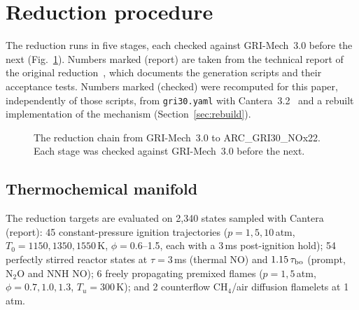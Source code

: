 \documentclass[preprint,review,12pt]{elsarticle}
\newcommand{\ce}[1]{\ensuremath{\mathrm{#1}}}
\begin{document}
\section{Reduction procedure}
\label{sec:reduction}

The reduction runs in five stages, each checked against GRI-Mech~3.0 before the next (Fig.~\ref{fig:pipeline}).
Numbers marked (report) are taken from the technical report of the original reduction~\cite{arcreport}, which
documents the generation scripts and their acceptance tests. Numbers marked (checked) were recomputed for this paper,
independently of those scripts, from \texttt{gri30.yaml} with Cantera~3.2~\cite{cantera} and a rebuilt
implementation of the mechanism (Section~\ref{sec:rebuild}).

\begin{figure}[t]
\centering
{}
\caption{The reduction chain from GRI-Mech~3.0 to ARC\_GRI30\_NOx22. Each stage was checked against GRI-Mech~3.0
before the next.}
\label{fig:pipeline}
\end{figure}

\subsection{Thermochemical manifold}
The reduction targets are evaluated on 2,340 states sampled with Cantera (report): 45 constant-pressure ignition
trajectories ($p=1,5,10$\,atm, $T_0=1150,1350,1550$\,K, $\phi=0.6$--1.5, each with a 3\,ms post-ignition hold);
54 perfectly stirred reactor states at $\tau=3$\,ms (thermal NO) and $1.15\,\tau_{\rm bo}$ (prompt, \ce{N_{2}O} and NNH
NO); 6 freely propagating premixed flames ($p=1,5$\,atm, $\phi=0.7,1.0,1.3$, $T_u=300$\,K); and 2 counterflow
\ce{CH_{4}}/air diffusion flamelets at 1\,atm.
\end{document}
